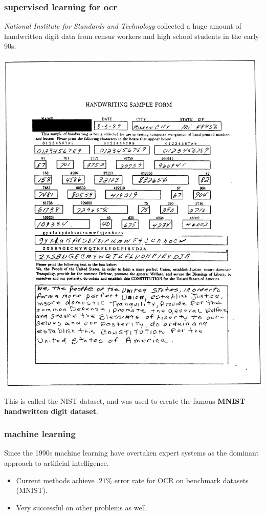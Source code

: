 \documentclass[handout,compress]{beamer}
\begin{document}
\begin{frame}
	\frametitle{supervised learning for ocr}
	\small
	\emph{National Institute for Standards and Technology} collected a huge amount of handwritten digit data from census workers and high school students in the early 90s:
	\vspace{-1em}
	\begin{center}
		\includegraphics[width=.4\textwidth]{nist_data.png}
		
		This is called the NIST dataset, and was used to create the famous \textbf{\alert{MNIST handwritten digit dataset}}.
	\end{center}

\end{frame}

\begin{frame}
	\frametitle{machine learning}
	Since the 1990s machine learning have overtaken expert systems as the dominant approach to artificial intelligence.
	\begin{itemize}
		\item Current methods achieve $.21\%$ error rate for OCR on benchmark datasets (MNIST).
		\item Very successful on other problems as well. 
	\end{itemize}
\end{frame}
\end{document}
